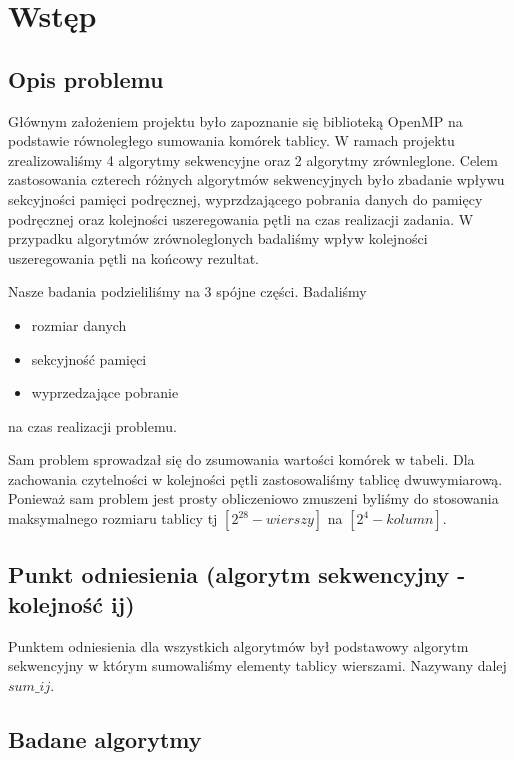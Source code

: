 \section{Wstęp}

\subsection{Opis problemu}

Głównym założeniem projektu było zapoznanie się biblioteką OpenMP na podstawie równoległego sumowania komórek tablicy. W ramach projektu zrealizowaliśmy 4 algorytmy sekwencyjne oraz 2 algorytmy zrównleglone. Celem zastosowania czterech różnych algorytmów sekwencyjnych było zbadanie wpływu sekcyjności pamięci podręcznej, wyprzdzającego pobrania danych do pamięcy podręcznej oraz kolejności uszeregowania pętli na czas realizacji zadania. W przypadku algorytmów zrównoleglonych badaliśmy wpływ kolejności uszeregowania pętli na końcowy rezultat.\newline

Nasze badania podzieliliśmy na 3 spójne części. Badaliśmy
\begin{itemize}
\item rozmiar danych
\item sekcyjność pamięci
\item wyprzedzające pobranie
\end{itemize}
na czas realizacji problemu.\newline

Sam problem sprowadzał się do zsumowania wartości komórek w tabeli. Dla zachowania czytelności w kolejności pętli zastosowaliśmy tablicę dwuwymiarową. Ponieważ sam problem jest prosty obliczeniowo zmuszeni byliśmy do stosowania maksymalnego rozmiaru tablicy tj $[2^{28} - wierszy]$ na $[2^{4} - kolumn]$.

\subsection{Punkt odniesienia (algorytm sekwencyjny - kolejność ij)}

Punktem odniesienia dla wszystkich algorytmów był podstawowy algorytm sekwencyjny w którym sumowaliśmy elementy tablicy wierszami. Nazywany dalej $sum\_ij$.




\subsection{Badane algorytmy}


